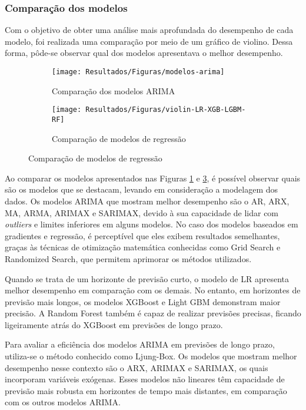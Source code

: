 \subsubsection{Compara\c c\~ao dos modelos}

Com o objetivo de obter uma análise mais aprofundada do desempenho de cada modelo, foi realizada uma comparação por meio de um gráfico de violino. Dessa forma, pôde-se observar qual dos modelos apresentava o melhor desempenho.


\begin{figure}[H]
	\centering
	\caption{Análise comparativa dos modelos utilizando gráficos de violino}
	\begin{subfigure}{0.9\textwidth}
		\texttt{[image: Resultados/Figuras/modelos-arima]}
		\caption{Comparação dos modelos ARIMA}
		\label{fig:modelos-arima}
	\end{subfigure}
	
	\begin{subfigure}{0.9\textwidth}
		\texttt{[image: Resultados/Figuras/violin-LR-XGB-LGBM-RF]}
		\caption{Comparação de modelos de regressão}
		\label{fig:violin-lr-xgb-lgbm-rf}
	\end{subfigure}
	
\end{figure}

Ao comparar os modelos apresentados nas Figuras \ref{fig:modelos-arima} e \ref{fig:violin-lr-xgb-lgbm-rf}, é possível observar quais são os modelos que se destacam, levando em consideração a modelagem dos dados. Os modelos ARIMA que mostram melhor desempenho são o AR, ARX, MA, ARMA, ARIMAX e SARIMAX, devido à sua capacidade de lidar com \textit{outliers} e limites inferiores em alguns modelos. No caso dos modelos baseados em gradientes e regressão, é perceptível que eles exibem resultados semelhantes, graças às técnicas de otimização matemática conhecidas como Grid Search e Randomized Search, que permitem aprimorar os métodos utilizados.

Quando se trata de um horizonte de previsão curto, o modelo de LR apresenta melhor desempenho em comparação com os demais. No entanto, em horizontes de previsão mais longos, os modelos XGBoost e Light GBM demonstram maior precisão. A Random Forest também é capaz de realizar previsões precisas, ficando ligeiramente atrás do XGBoost em previsões de longo prazo.

Para avaliar a eficiência dos modelos ARIMA em previsões de longo prazo, utiliza-se o método conhecido como Ljung-Box. Os modelos que mostram melhor desempenho nesse contexto são o ARX, ARIMAX e SARIMAX, os quais incorporam variáveis exógenas. Esses modelos não lineares têm capacidade de previsão mais robusta em horizontes de tempo mais distantes, em comparação com os outros modelos ARIMA.
